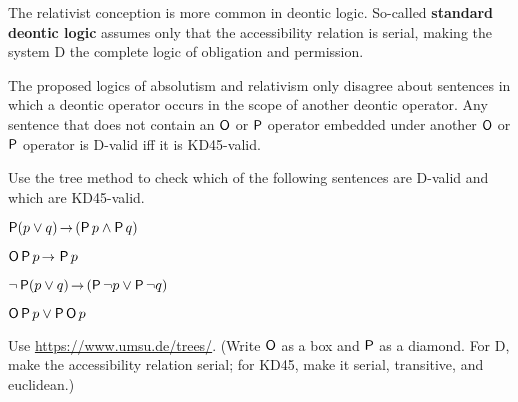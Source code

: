 The relativist conception is more common in deontic logic. So-called
\textbf{standard deontic logic} assumes only that the accessibility relation is
serial, making the system D the complete logic of obligation and permission.

The proposed logics of absolutism and relativism only disagree about sentences
in which a deontic operator occurs in the scope of another deontic operator. Any
sentence that does not contain an $\operatorname{\mathsf{O}}$ or $\operatorname{\mathsf{P}}$ operator embedded under another
$\operatorname{\mathsf{O}}$ or $\operatorname{\mathsf{P}}$ operator is D-valid iff it is KD45-valid.


\begin{exercise}
  Use the tree method to check which of the following sentences are D-valid and
  which are KD45-valid.
  \begin{exlist}
    \item $\Pe (p \lor q) \to (\Pe p \land \Pe q)$
    \item $\Ob\Pe p \to \Pe p$
    \item $\neg\Pe(p \lor q) \to (\Pe \neg p \lor \Pe\neg q)$
    \item $\operatorname{\mathsf{O}}\operatorname{\mathsf{P}} p \lor \operatorname{\mathsf{P}}\operatorname{\mathsf{O}} p$
  \end{exlist}
\end{exercise}
\begin{solution}
  Use
  \href{https://www.umsu.de/trees/}{https://www.umsu.de/trees/}.
  (Write $\operatorname{\mathsf{O}}$ as a box and $\operatorname{\mathsf{P}}$ as a diamond. For D, make the accessibility
  relation serial; for KD45, make it serial, transitive, and euclidean.)
\end{solution}


